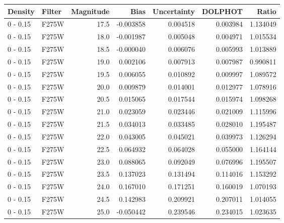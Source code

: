 \begin{tabular}{llrrrrr}
\toprule
  Density & Filter &  Magnitude &      Bias &  Uncertainty &   DOLPHOT &     Ratio \\
\midrule
 0 - 0.15 &  F275W &       17.5 & -0.003858 &     0.004518 &  0.003984 &  1.134049 \\
 0 - 0.15 &  F275W &       18.0 & -0.001987 &     0.005048 &  0.004971 &  1.015534 \\
 0 - 0.15 &  F275W &       18.5 & -0.000040 &     0.006076 &  0.005993 &  1.013889 \\
 0 - 0.15 &  F275W &       19.0 &  0.002106 &     0.007913 &  0.007987 &  0.990811 \\
 0 - 0.15 &  F275W &       19.5 &  0.006055 &     0.010892 &  0.009997 &  1.089572 \\
 0 - 0.15 &  F275W &       20.0 &  0.009879 &     0.014001 &  0.012977 &  1.078916 \\
 0 - 0.15 &  F275W &       20.5 &  0.015065 &     0.017544 &  0.015974 &  1.098268 \\
 0 - 0.15 &  F275W &       21.0 &  0.023059 &     0.023446 &  0.021009 &  1.115996 \\
 0 - 0.15 &  F275W &       21.5 &  0.034013 &     0.033485 &  0.028010 &  1.195487 \\
 0 - 0.15 &  F275W &       22.0 &  0.043005 &     0.045021 &  0.039973 &  1.126294 \\
 0 - 0.15 &  F275W &       22.5 &  0.064932 &     0.064028 &  0.055000 &  1.164144 \\
 0 - 0.15 &  F275W &       23.0 &  0.088065 &     0.092049 &  0.076996 &  1.195507 \\
 0 - 0.15 &  F275W &       23.5 &  0.137023 &     0.131494 &  0.114016 &  1.153292 \\
 0 - 0.15 &  F275W &       24.0 &  0.167010 &     0.171251 &  0.160019 &  1.070193 \\
 0 - 0.15 &  F275W &       24.5 &  0.142983 &     0.209921 &  0.207011 &  1.014055 \\
 0 - 0.15 &  F275W &       25.0 & -0.050442 &     0.239546 &  0.234015 &  1.023635 \\
\bottomrule
\end{tabular}
